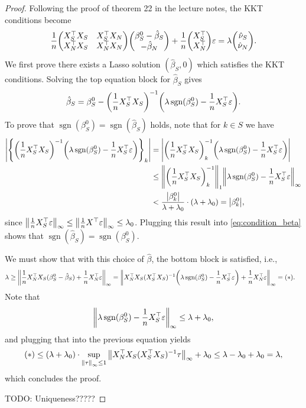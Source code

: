 \documentclass{article}
\theoremstyle{plain}
\theoremstyle{remark}
\renewcommand{\epsilon}{\varepsilon}
\newcommand{\T}{^\top} %
\newcommand\eps\epsilon
\newcommand\TODO{{\color{red} TODO: }}
\DeclareMathOperator{\sign}{sgn}
\begin{document}
\begin{proof}
	Following the proof of theorem 22 in the lecture notes, the KKT conditions become 
	\[
	\frac1n \mqty(X_S\T X_S & X_S\T X_N \\ X_N\T X_S & X_N\T X_N) \mqty( \beta^0_S - \hat\beta_S \\ - \hat\beta_N) + \frac1n \mqty(X_S\T \\ X_N\T) \eps  = \lambda \mqty(\hat\nu_S \\ \hat\nu_N). 
	\]
	We first prove there exists a Lasso solution $(\hat\beta_S, 0)$ which satisfies the KKT conditions. 
	Solving the top equation block for $\hat\beta_S$ gives
	\begin{equation} \label{eq:condition_beta}
	\hat\beta_S = \beta^0_S - \qty(\frac1n X_S\T X_S)^{-1} \qty(\lambda \sign(\beta^0_S) - \frac1n X_S\T \eps).
	\end{equation}
	To prove that $\sign(\beta^0_S) = \sign(\hat\beta_S)$ holds, note that for $k \in S$ we have
	\begin{align*}
		\abs{\qty{\qty(\frac1n X_S\T X_S)^{-1} \qty(\lambda \sign(\beta^0_S) - \frac1n X_S\T \eps)}_k} &= \abs{\qty(\frac1n X_S\T X_S)^{-1}_k \qty(\lambda \sign(\beta^0_S) - \frac1n X_S\T \eps)} \\
		&\leq \norm{\qty(\frac1n X_S\T X_S)^{-1}_k}_1 \norm{\lambda \sign(\beta^0_S) - \frac1n X_S\T \eps}_\infty \\
		&< \frac{\abs{\beta^0_k}}{\lambda + \lambda_0} \cdot (\lambda + \lambda_0) = \abs{\beta^0_k}, 
	\end{align*}
since $\norm{\frac1nX_S\T\eps}_\infty \leq \norm{\frac1n X\T\eps}_\infty \leq \lambda_0$.  Plugging this result into \cref{eq:condition_beta} shows that $\sign(\hat\beta_S) = \sign(\beta^0_S)$. 

We must show that with this choice of $\hat\beta$, the bottom block is satisfied, i.e., 
\begin{align*}
\lambda \geq \norm{\frac1n X_N\T X_S(\beta^0_S - \hat\beta_S) + \frac1n X_N\T\eps}_\infty &= \norm{X_N\T X_S (X_S\T X_S)^{-1} \qty(\lambda \sign(\beta^0_S) - \frac1n X_S\T\eps) + \frac1n X_N\T \eps}_\infty = (*). 
\end{align*}
Note that
\[
\norm{\lambda \sign(\beta^0_S) - \frac1nX_S\T\eps}_\infty \leq \lambda + \lambda_0, 
\]
and plugging that into the previous equation yields
\[
(*)  \leq (\lambda + \lambda_0) \cdot \sup_{\norm{\tau}_\infty \leq 1} \norm{X_N\T X_S (X_S\T X_S)^{-1} \tau}_\infty + \lambda_0 \leq \lambda- \lambda_0 + \lambda_0 = \lambda, 
\]
which concludes the proof. 

\TODO Uniqueness?????
\end{proof}
\end{document}
